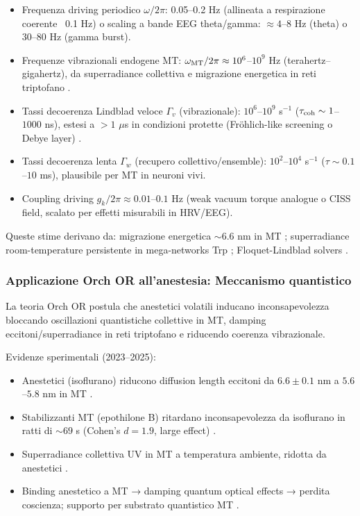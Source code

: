 \documentclass[11pt,a4paper]{article}
\let\oldcite\cite
\renewcommand{\cite}{\protect\oldcite}
\theoremstyle{plain}
\theoremstyle{definition}
\begin{document}
\begin{itemize}
    \item Frequenza driving periodico $\omega / 2\pi$: 0.05--0.2 Hz (allineata a respirazione coerente ~0.1 Hz) o scaling a bande EEG theta/gamma: $\approx 4$--$8$ Hz (theta) o $30$--$80$ Hz (gamma burst).
    \item Frequenze vibrazionali endogene MT: $\omega_{\rm MT} / 2\pi \approx 10^6$--$10^9$ Hz (terahertz–gigahertz), da superradiance collettiva e migrazione energetica in reti triptofano \cite{Babcock2024superradiance, Kalra2023electronic}.
    \item Tassi decoerenza Lindblad veloce $\Gamma_v$ (vibrazionale): $10^6$--$10^9$ s$^{-1}$ ($\tau_{\rm coh} \sim 1$--$1000$ ns), estesi a $>1$ $\mu$s in condizioni protette (Fröhlich-like screening o Debye layer) \cite{Wiest2025niaf011}.
    \item Tassi decoerenza lenta $\Gamma_w$ (recupero collettivo/ensemble): $10^2$--$10^4$ s$^{-1}$ ($\tau \sim 0.1$--$10$ ms), plausibile per MT in neuroni vivi.
    \item Coupling driving $g_k / 2\pi \approx 0.01$--$0.1$ Hz (weak vacuum torque analogue o CISS field, scalato per effetti misurabili in HRV/EEG).
\end{itemize}

Queste stime derivano da: migrazione energetica $\sim 6.6$ nm in MT \cite{Kalra2023electronic}; superradiance room-temperature persistente in mega-networks Trp \cite{Babcock2024superradiance}; Floquet-Lindblad solvers \cite{Clawson2024FLiME}.



\vspace{0.5cm}

\subsubsection{Applicazione Orch OR all’anestesia: Meccanismo quantistico}

La teoria Orch OR postula che anestetici volatili inducano inconsapevolezza bloccando oscillazioni quantistiche collettive in MT, damping eccitoni/superradiance in reti triptofano e riducendo coerenza vibrazionale.

\vspace{0.2cm}

Evidenze sperimentali (2023–2025):
\begin{itemize}
    \item Anestetici (isoflurano) riducono diffusion length eccitoni da $6.6 \pm 0.1$ nm a $5.6$--$5.8$ nm in MT \cite{Kalra2023electronic}.
    \item Stabilizzanti MT (epothilone B) ritardano inconsapevolezza da isoflurano in ratti di $\sim 69$ s (Cohen's $d = 1.9$, large effect) \cite{Khan2024eNeuro}.
    \item Superradiance collettiva UV in MT a temperatura ambiente, ridotta da anestetici \cite{Babcock2024superradiance}.
    \item Binding anestetico a MT → damping quantum optical effects → perdita coscienza; supporto per substrato quantistico MT \cite{Wiest2025niaf011}.
\end{itemize}
\end{document}
